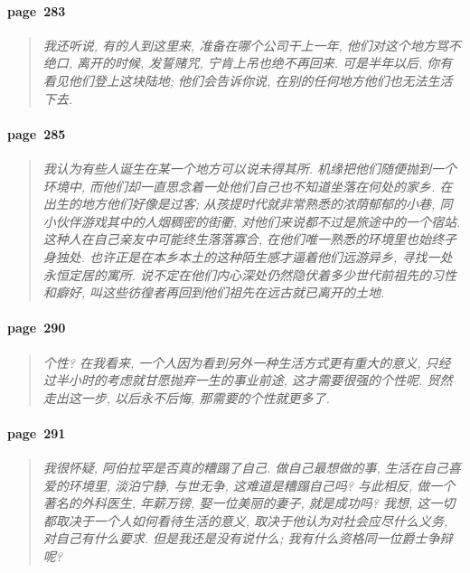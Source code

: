 \paragraph*{page~283}
\begin{quotation}
    \itshape
    我还听说, 有的人到这里来, 准备在哪个公司干上一年, 他们对这个地方骂不绝口, 离开的时候, 发誓赌咒, 宁肯上吊也绝不再回来. 可是半年以后, 你有看见他们登上这块陆地; 他们会告诉你说, 在别的任何地方他们也无法生活下去. 
\end{quotation}

\paragraph*{page~285}
\begin{quotation}
    \itshape
    我认为有些人诞生在某一个地方可以说未得其所. 机缘把他们随便抛到一个环境中, 而他们却一直思念着一处他们自己也不知道坐落在何处的家乡. 在出生的地方他们好像是过客; 从孩提时代就非常熟悉的浓荫郁郁的小巷, 同小伙伴游戏其中的人烟稠密的街衢, 对他们来说都不过是旅途中的一个宿站. 这种人在自己亲友中可能终生落落寡合, 在他们唯一熟悉的环境里也始终孑身独处. 也许正是在本乡本土的这种陌生感才逼着他们远游异乡, 寻找一处永恒定居的寓所. 说不定在他们内心深处仍然隐伏着多少世代前祖先的习性和癖好, 叫这些彷徨者再回到他们祖先在远古就已离开的土地. 
\end{quotation}

\paragraph*{page~290}
\begin{quotation}
    \itshape
    个性? 在我看来, 一个人因为看到另外一种生活方式更有重大的意义, 只经过半小时的考虑就甘愿抛弃一生的事业前途, 这才需要很强的个性呢. 贸然走出这一步, 以后永不后悔, 那需要的个性就更多了.
\end{quotation}

\paragraph*{page~291}
\begin{quotation}
    \itshape
    我很怀疑, 阿伯拉罕是否真的糟蹋了自己. 做自己最想做的事, 生活在自己喜爱的环境里, 淡泊宁静, 与世无争, 这难道是糟蹋自己吗? 与此相反, 做一个著名的外科医生, 年薪万镑, 娶一位美丽的妻子, 就是成功吗? 我想, 这一切都取决于一个人如何看待生活的意义, 取决于他认为对社会应尽什么义务, 对自己有什么要求. 但是我还是没有说什么; 我有什么资格同一位爵士争辩呢? 
\end{quotation}

